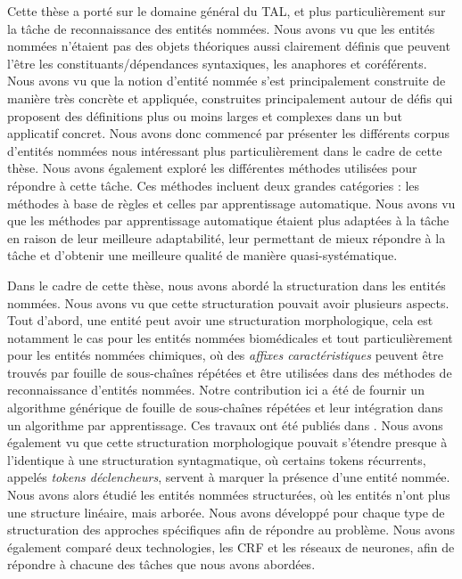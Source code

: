 \documentclass[PhD-Yoann-Dupont.tex]{subfiles}
\begin{document}
Cette thèse a porté sur le domaine général du TAL, et plus particulièrement sur la tâche de reconnaissance des entités nommées. Nous avons vu que les entités nommées n'étaient pas des objets théoriques aussi clairement définis que peuvent l'être les constituants/dépendances syntaxiques, les anaphores et coréférents. Nous avons vu que la notion d'entité nommée s'est principalement construite de manière très concrète et appliquée, construites principalement autour de défis qui proposent des définitions plus ou moins larges et complexes dans un but applicatif concret. Nous avons donc commencé par présenter les différents corpus d'entités nommées nous intéressant plus particulièrement dans le cadre de cette thèse. Nous avons également exploré les différentes méthodes utilisées pour répondre à cette tâche. Ces méthodes incluent deux grandes catégories : les méthodes à base de règles et celles par apprentissage automatique. Nous avons vu que les méthodes par apprentissage automatique étaient plus adaptées à la tâche en raison de leur meilleure adaptabilité, leur permettant de mieux répondre à la tâche et d'obtenir une meilleure qualité de manière quasi-systématique.

Dans le cadre de cette thèse, nous avons abordé la structuration dans les entités nommées. Nous avons vu que cette structuration pouvait avoir plusieurs aspects. Tout d'abord, une entité peut avoir une structuration morphologique, cela est notamment le cas pour les entités nommées biomédicales et tout particulièrement pour les entités nommées chimiques, où des \emph{affixes caractéristiques} peuvent être trouvés par fouille de sous-chaînes répétées et être utilisées dans des méthodes de reconnaissance d'entités nommées. Notre contribution ici a été de fournir un algorithme générique de fouille de sous-chaînes répétées et leur intégration dans un algorithme par apprentissage. Ces travaux ont été publiés dans \citet{dupont2016extraction}. Nous avons également vu que cette structuration morphologique pouvait s'étendre presque à l'identique à une structuration syntagmatique, où certains tokens récurrents, appelés \emph{tokens déclencheurs}, servent à marquer la présence d'une entité nommée. Nous avons alors étudié les entités nommées structurées, où les entités n'ont plus une structure linéaire, mais arborée. Nous avons développé pour chaque type de structuration des approches spécifiques afin de répondre au problème. Nous avons également comparé deux technologies, les CRF et les réseaux de neurones, afin de répondre à chacune des tâches que nous avons abordées.
\end{document}
